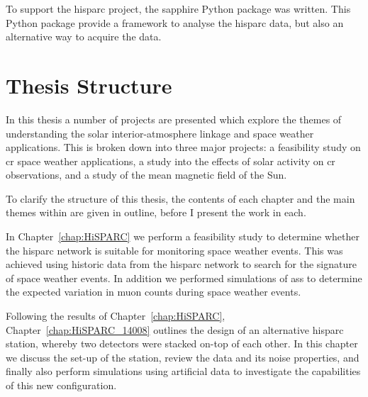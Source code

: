 To support the \gls{hisparc} project, the \gls{sapphire} Python package \citep{fokkema_hisparc_2012,fokkema_sapphire_2012} was written. This Python package provide a framework to analyse the \gls{hisparc} data, but also an alternative way to acquire the data.








\section{Thesis Structure}

In this thesis a number of projects are presented which explore the themes of understanding the solar interior-atmosphere linkage and space weather applications. This is broken down into three major projects: a feasibility study on \gls{cr} space weather applications, a study into the effects of solar activity on \gls{cr} observations, and a study of the mean magnetic field of the Sun.

To clarify the structure of this thesis, the contents of each chapter and the main themes within are given in outline, before I present the work in each.

In Chapter~\ref{chap:HiSPARC} we perform a feasibility study to determine whether the \gls{hisparc} network is suitable for monitoring space weather events. This was achieved using historic data from the \gls{hisparc} network to search for the signature of space weather events. In addition we performed simulations of \glspl{as} to determine the expected variation in muon counts during space weather events.

Following the results of Chapter~\ref{chap:HiSPARC}, Chapter~\ref{chap:HiSPARC_14008} outlines the design of an alternative \gls{hisparc} station, whereby two detectors were stacked on-top of each other. In this chapter we discuss the set-up of the station, review the data and its noise properties, and finally also perform simulations using artificial data to investigate the capabilities of this new configuration.

